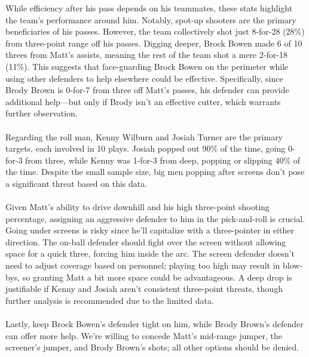 \documentclass[a4paper,12pt]{article}
\begin{document}
\begin{multicols}{2}
    While efficiency after his pass depends on his teammates, these stats highlight the team's performance around him. Notably, spot-up shooters are the primary beneficiaries of his passes. However, the team collectively shot just 8-for-28 (28\%) from three-point range off his passes. Digging deeper, Brock Bowen made 6 of 10 threes from Matt's assists, meaning the rest of the team shot a mere 2-for-18 (11\%). This suggests that face-guarding Brock Bowen on the perimeter while using other defenders to help elsewhere could be effective. Specifically, since Brody Brown is 0-for-7 from three off Matt's passes, his defender can provide additional help—but only if Brody isn't an effective cutter, which warrants further observation. \\ \\
    Regarding the roll man, Kenny Wilburn and Josiah Turner are the primary targets, each involved in 10 plays. Josiah popped out 90\% of the time, going 0-for-3 from three, while Kenny was 1-for-3 from deep, popping or slipping 40\% of the time. Despite the small sample size, big men popping after screens don't pose a significant threat based on this data.\\ \\
    Given Matt's ability to drive downhill and his high three-point shooting percentage, assigning an aggressive defender to him in the pick-and-roll is crucial. Going under screens is risky since he'll capitalize with a three-pointer in either direction. The on-ball defender should fight over the screen without allowing space for a quick three, forcing him inside the arc. The screen defender doesn't need to adjust coverage based on personnel; playing too high may result in blow-bys, so granting Matt a bit more space could be advantageous. A deep drop is justifiable if Kenny and Josiah aren't consistent three-point threats, though further analysis is recommended due to the limited data. \\ \\
    Lastly, keep Brock Bowen's defender tight on him, while Brody Brown's defender can offer more help. We're willing to concede Matt's mid-range jumper, the screener's jumper, and Brody Brown's shots; all other options should be denied.      
    \vspace{1em}
    

\end{multicols}
\end{document}

